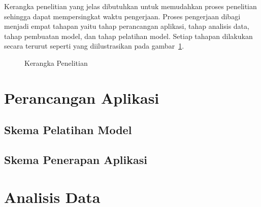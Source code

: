 Kerangka penelitian yang jelas dibutuhkan untuk memudahkan proses penelitian sehingga dapat
mempersingkat waktu pengerjaan. Proses pengerjaan dibagi menjadi empat tahapan yaitu tahap
perancangan aplikasi, tahap analisis data, tahap pembuatan model, dan tahap pelatihan model.
Setiap tahapan dilakukan secara terurut seperti yang diilustrasikan pada gambar~\ref{fig:kerangkapenelitian}.

\begin{figure}[htbp]
    \begin{center}
    \end{center}
    \vspace{-20pt}
    \captionsetup{labelfont=bf, textfont=bf}
    \caption{Kerangka Penelitian}
    \vspace{-10pt}
    \captionsetup{labelfont=md, textfont=md}
    \label{fig:kerangkapenelitian}
\end{figure}

\section{Perancangan Aplikasi} \label{sec:3-PerancanganAplikasi}

\subsection{Skema Pelatihan Model}

\subsection{Skema Penerapan Aplikasi}

\section{Analisis Data} \label{sec:3-AnalisisData}

